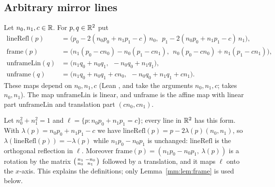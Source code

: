 \subsection{Arbitrary mirror lines}

\begin{definition}\label{mm:def:frame}
Let $n_0,n_1,c\in\mathbb R$. For $p,q\in\mathbb R^2$ put
\begin{align*}
\mathrm{lineRefl}(p)&=\bigl(p_0-2(n_0p_0+n_1p_1-c)\,n_0,\ \ p_1-2(n_0p_0+n_1p_1-c)\,n_1\bigr),\\
\mathrm{frame}(p)&=\bigl(n_1(p_0-cn_0)-n_0(p_1-cn_1),\ \ n_0(p_0-cn_0)+n_1(p_1-cn_1)\bigr),\\
\mathrm{unframeLin}(q)&=\bigl(n_1q_0+n_0q_1,\ \ -n_0q_0+n_1q_1\bigr),\\
\mathrm{unframe}(q)&=\bigl(n_1q_0+n_0q_1+cn_0,\ \ -n_0q_0+n_1q_1+cn_1\bigr).
\end{align*}
These maps depend on $n_0,n_1,c$ (Lean ,  and  take the
arguments $n_0,n_1,c$;  takes $n_0,n_1$). The map $\mathrm{unframeLin}$ is linear, and
$\mathrm{unframe}$ is the affine map with linear part $\mathrm{unframeLin}$ and translation part
$(cn_0,cn_1)$.
\end{definition}

\begin{remark}
Let $n_0^2+n_1^2=1$ and $\ell=\{p:n_0p_0+n_1p_1=c\}$; every line in $\mathbb R^2$ has this form. With
$\lambda(p)=n_0p_0+n_1p_1-c$ we have $\mathrm{lineRefl}(p)=p-2\lambda(p)(n_0,n_1)$, so
$\lambda(\mathrm{lineRefl}(p))=-\lambda(p)$ while $n_1p_0-n_0p_1$ is unchanged: $\mathrm{lineRefl}$ is the
orthogonal reflection in $\ell$. Moreover $\mathrm{frame}(p)=(n_1p_0-n_0p_1,\ \lambda(p))$ is a rotation by
the matrix $\begin{psmallmatrix}n_1&-n_0\\ n_0&n_1\end{psmallmatrix}$ followed by a translation, and it maps
$\ell$ onto the $x$-axis. This explains the definitions; only Lemma~\ref{mm:lem:frame} is used below.
\end{remark}

